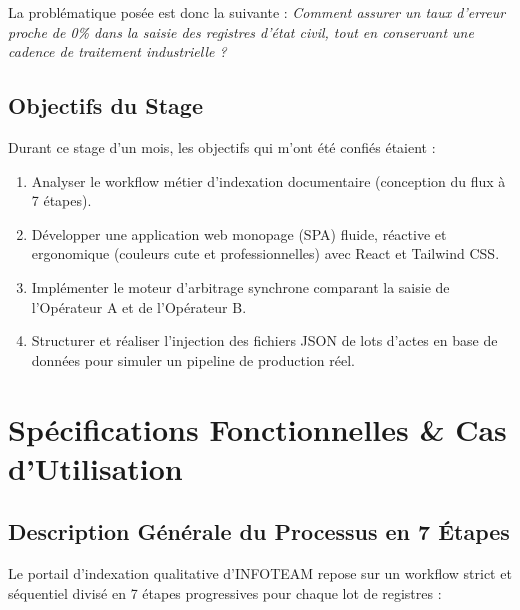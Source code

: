 \documentclass[12pt,a4paper,oneside]{report}
\begin{document}
La problématique posée est donc la suivante : \textit{Comment assurer un taux d'erreur proche de 0\% dans la saisie des registres d'état civil, tout en conservant une cadence de traitement industrielle ?}

\section{Objectifs du Stage}
Durant ce stage d'un mois, les objectifs qui m'ont été confiés étaient :
\begin{enumerate}
    \item Analyser le workflow métier d'indexation documentaire (conception du flux à 7 étapes).
    \item Développer une application web monopage (SPA) fluide, réactive et ergonomique (couleurs cute et professionnelles) avec React et Tailwind CSS.
    \item Implémenter le moteur d'arbitrage synchrone comparant la saisie de l'Opérateur A et de l'Opérateur B.
    \item Structurer et réaliser l'injection des fichiers JSON de lots d'actes en base de données pour simuler un pipeline de production réel.
\end{enumerate}

\chapter{Spécifications Fonctionnelles \& Cas d'Utilisation}

\section{Description Générale du Processus en 7 Étapes}
Le portail d'indexation qualitative d'INFOTEAM repose sur un workflow strict et séquentiel divisé en 7 étapes progressives pour chaque lot de registres :
\end{document}
